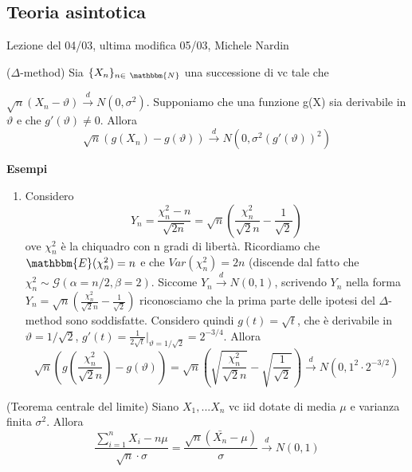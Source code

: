 \subsection{Teoria asintotica}
Lezione del 04/03, ultima modifica 05/03, Michele Nardin

\begin{teo}
\noindent
($\Delta$-method) Sia $\{X_n\}_{n \in\ \mathbbm{N}}$ una successione di vc
tale che 

\noindent $\sqrt{n}(X_n-\vartheta)\stackrel{d}{\rightarrow}N(0,\sigma^2)$. 
Supponiamo che una funzione g(X) sia derivabile in $\vartheta$ e che $g'(\vartheta)\neq0$. Allora $$\sqrt{n}(g(X_n)-g(\vartheta))\stackrel{d}{\rightarrow}N(0,\sigma^2(g'(\vartheta))^2)$$
\end{teo}

\textbf{Esempi}
\begin{enumerate}
\item Considero $$Y_n=\frac{\chi^2_n-n}{\sqrt{2n}}=\sqrt{n}\left(\frac{\chi^2_n}{\sqrt{2}n}-\frac{1}{\sqrt{2}}\right)$$ ove $\chi^2_n$ è la chiquadro con n gradi di libertà. 
Ricordiamo che $\mathbbm{E}(\chi^2_n)=n$ e che $Var(\chi^2_n)=2n$ (discende dal fatto che $\chi^2_n \sim \mathcal{G}(\alpha=n/2,\beta=2)$. 
Siccome $Y_n \stackrel{d}{\rightarrow} N(0,1)$, scrivendo $Y_n$ nella forma $Y_n=\sqrt{n}\left(\frac{\chi^2_n}{\sqrt{2}n}-\frac{1}{\sqrt{2}}\right)$ riconosciamo che la prima parte delle ipotesi del $\Delta$-method sono soddisfatte.
Considero quindi $g(t)=\sqrt{t}$, che è derivabile in $\vartheta=1/\sqrt{2}$, $g'(t)=\frac{1}{2\sqrt{t}}|_{\vartheta=1/\sqrt{2}}=2^{-3/4}$.
Allora $$\sqrt{n}(g\left(\frac{\chi^2_n}{\sqrt{2}n}\right)-g(\vartheta))=
\sqrt{n}\left(\sqrt{\frac{\chi^2_n}{\sqrt{2}n}}-\sqrt{\frac{1}{\sqrt{2}}}\right)
\stackrel{d}{\rightarrow}N(0,1^2\cdot 2^{-3/2})$$
\end{enumerate}

\begin{teo}
(Teorema centrale del limite) Siano $X_1,...X_n$ vc iid dotate di media $\mu$ e varianza finita $\sigma^2$. Allora 
$$\frac{\sum_{i=1}^n X_i - n\mu}{\sqrt{n}\cdot \sigma} = \frac{\sqrt{n}(\bar{X_n}-\mu)}{\sigma}\stackrel{d}{\rightarrow}N(0,1) $$
\end{teo}

